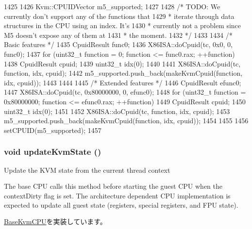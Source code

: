 \begin{DoxyCode}
1425 {
1426     Kvm::CPUIDVector m5_supported;
1427 
1428     /* TODO: We currently don't support any of the functions that
1429      * iterate through data structures in the CPU using an index. It's
1430      * currently not a problem since M5 doesn't expose any of them at
1431      * the moment.
1432      */
1433 
1434     /* Basic features */
1435     CpuidResult func0;
1436     X86ISA::doCpuid(tc, 0x0, 0, func0);
1437     for (uint32_t function = 0; function <= func0.rax; ++function) {
1438         CpuidResult cpuid;
1439         uint32_t idx(0);
1440 
1441         X86ISA::doCpuid(tc, function, idx, cpuid);
1442         m5_supported.push_back(makeKvmCpuid(function, idx, cpuid));
1443     }
1444 
1445     /* Extended features */
1446     CpuidResult efunc0;
1447     X86ISA::doCpuid(tc, 0x80000000, 0, efunc0);
1448     for (uint32_t function = 0x80000000; function <= efunc0.rax; ++function) {
1449         CpuidResult cpuid;
1450         uint32_t idx(0);
1451 
1452         X86ISA::doCpuid(tc, function, idx, cpuid);
1453         m5_supported.push_back(makeKvmCpuid(function, idx, cpuid));
1454     }
1455 
1456     setCPUID(m5_supported);
1457 }
\end{DoxyCode}
\hypertarget{classX86KvmCPU_a93c6e8c82dfb63c7039f0cbf064fae5d}{
\subsubsection[{updateKvmState}]{\setlength{\rightskip}{0pt plus 5cm}void updateKvmState ()}}
\label{classX86KvmCPU_a93c6e8c82dfb63c7039f0cbf064fae5d}
Update the KVM state from the current thread context

The base CPU calls this method before starting the guest CPU when the contextDirty flag is set. The architecture dependent CPU implementation is expected to update all guest state (registers, special registers, and FPU state). 

\hyperlink{classBaseKvmCPU_a48817be7bf03ef44cc5114ecf4df9b27}{BaseKvmCPU}を実装しています。


